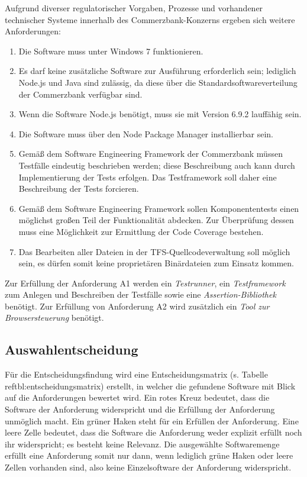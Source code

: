 \newpage
Aufgrund diverser regulatorischer Vorgaben, Prozesse und vorhandener technischer Systeme innerhalb des Commerzbank-Konzerns ergeben sich weitere Anforderungen:
\begin{enumerate}[label=\textbf{CB\arabic*}]
	\item Die Software muss unter Windows 7 funktionieren.
	\item Es darf keine zusätzliche Software zur Ausführung erforderlich sein; lediglich Node.js und Java sind zulässig, da diese über die Standardsoftwareverteilung der Commerzbank verfügbar sind.
	\item Wenn die Software Node.js benötigt, muss sie mit Version 6.9.2 lauffähig sein.
	\item Die Software muss über den Node Package Manager installierbar sein.
	\item Gemäß dem Software Engineering Framework der Commerzbank müssen Testfälle eindeutig beschrieben werden; diese Beschreibung auch kann durch Implementierung der Tests erfolgen\cite{coba-sef}. Das Testframework soll daher eine Beschreibung der Tests forcieren.
	\item Gemäß dem Software Engineering Framework sollen Komponententests \glqq einen möglichst großen Teil der Funktionalität abdecken\grqq{}\cite{coba-sef}. Zur Überprüfung dessen muss eine Möglichkeit zur Ermittlung der Code Coverage bestehen.
	\item Das Bearbeiten aller Dateien in der TFS-Quellcodeverwaltung soll möglich sein, es dürfen somit keine proprietären Binärdateien zum Einsatz kommen.
\end{enumerate}

Zur Erfüllung der Anforderung A1 werden ein \textit{Testrunner}, ein \textit{Testframework} zum Anlegen und Beschreiben der Testfälle sowie eine \textit{Assertion-Bibliothek} benötigt. Zur Erfüllung von Anforderung A2 wird zusätzlich ein \textit{Tool zur Browsersteuerung} benötigt.

\newpage


\newpage
\subsection{Auswahlentscheidung}
\label{sec:auswahlentscheidung}
Für die Entscheidungsfindung wird eine Entscheidungsmatrix (s. Tabelle \\ref{tbl:entscheidungsmatrix}) erstellt, in welcher die gefundene Software mit Blick auf die Anforderungen bewertet wird. Ein rotes Kreuz bedeutet, dass die Software der Anforderung widerspricht und die Erfüllung der Anforderung unmöglich macht. Ein grüner Haken steht für ein Erfüllen der Anforderung. Eine leere Zelle bedeutet, dass die Software die Anforderung weder explizit erfüllt noch ihr widerspricht; es besteht keine Relevanz. Die ausgewählte Softwaremenge erfüllt eine Anforderung somit nur dann, wenn lediglich grüne Haken oder leere Zellen vorhanden sind, also keine Einzelsoftware der Anforderung widerspricht.


